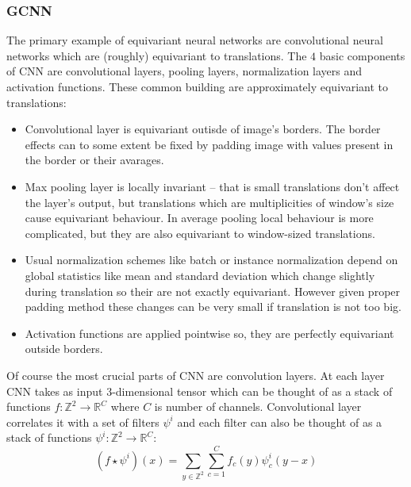     \subsubsection{GCNN}
    The primary example of equivariant neural networks are convolutional neural
    networks which are (roughly) equivariant to translations. The $4$ basic
    components of CNN are convolutional layers, pooling layers, normalization
    layers and activation functions.  These common building are approximately
    equivariant to translations:
    \begin{itemize}
        \item Convolutional layer is
            equivariant outisde of image's borders. The border effects can to
            some extent be fixed by padding image with values present in the
            border or their avarages.
        \item Max pooling layer is locally invariant -- that is small translations don't
            affect the layer's output, but translations which are multiplicities
            of window's size cause equivariant behaviour.
            In average pooling local behaviour is more
            complicated, but they are also equivariant to window-sized
            translations.
        \item Usual normalization schemes like batch or instance
            normalization depend on global statistics
            like mean and standard deviation which change slightly during
            translation so their are not exactly equivariant. However given
            proper padding method these changes can be very small if
            translation is not too big.
        \item Activation functions are applied pointwise so, they are
            perfectly equivariant outside borders.
    \end{itemize}
    Of course the most crucial parts of CNN are convolution layers. At each
    layer CNN takes as input 3-dimensional tensor which can be thought of as a
    stack of functions $f:\mathbb{Z}^2\to\mathbb{R}^C$ where $C$ is number of channels.
    Convolutional layer correlates it with a set of filters $\psi^i$
    and each filter can also be thought of as a stack of functions
    $\psi^i:\mathbb{Z}^2\to\mathbb{R}^C$:
    \begin{equation}
        \label{eq:cnn}
        (f\star\psi^i)(x) = \sum_{y\in\mathbb{Z}^2}\sum_{c=1}^C
        f_c(y)\psi_{c}^{i}(y-x)
    \end{equation}

